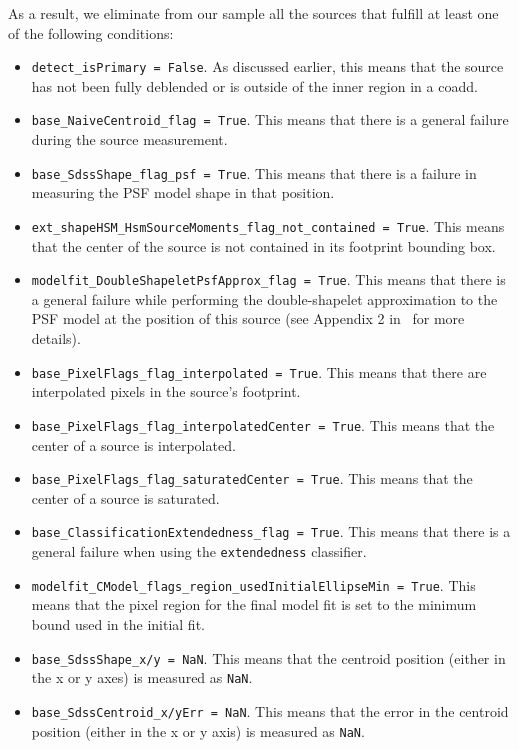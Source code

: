 \documentclass[a4paper,fleqn,usenatbib]{mnras}
\begin{document}
As a result, we eliminate from our sample all the sources that fulfill at least one of the following conditions:
\begin{itemize}
\item \texttt{detect\_isPrimary = False}. As discussed earlier, this means that the source has not been fully deblended or is outside of the inner region in a coadd.
\item \texttt{base\_NaiveCentroid\_flag = True}. This means that there is a general failure during the source measurement.
\item \texttt{base\_SdssShape\_flag\_psf = True}. This means that there is a failure in measuring the PSF model shape in that position.
\item \texttt{ext\_shapeHSM\_HsmSourceMoments\_flag\_not\_contained = True}. This means that the center of the source is not contained in its footprint bounding box.
\item \texttt{modelfit\_DoubleShapeletPsfApprox\_flag = True}. This means that there is a general failure while performing the double-shapelet approximation to the PSF model at the position of this source (see Appendix 2 in~\citet{2018PASJ...70S...5B} for more details).
\item \texttt{base\_PixelFlags\_flag\_interpolated = True}. This means that there are interpolated pixels in the source's footprint.
\item \texttt{base\_PixelFlags\_flag\_interpolatedCenter = True}. This means that the center of a source is interpolated.
\item \texttt{base\_PixelFlags\_flag\_saturatedCenter = True}. This means that the center of a source is saturated.
\item \texttt{base\_ClassificationExtendedness\_flag = True}. This means that there is a general failure when using the \texttt{extendedness} classifier.
\item \texttt{modelfit\_CModel\_flags\_region\_usedInitialEllipseMin = True}. This means that the pixel region for the final model fit is set to the minimum bound used in the initial fit.
\item \texttt{base\_SdssShape\_x/y = NaN}. This means that the centroid position (either in the x or y axes) is measured as \texttt{NaN}.
\item \texttt{base\_SdssCentroid\_x/yErr = NaN}. This means that the error in the centroid position (either in the x or y axis) is measured as \texttt{NaN}.
\end{itemize}
\end{document}
